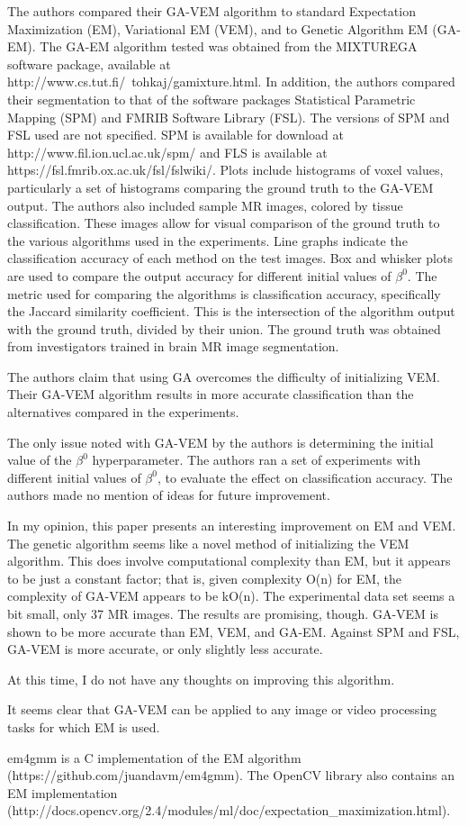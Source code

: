 \documentclass[11pt]{article}
\begin{document}
The authors compared their GA-VEM algorithm to standard Expectation Maximization
(EM), Variational EM (VEM), and to Genetic Algorithm EM (GA-EM). The GA-EM
algorithm tested was obtained from the MIXTUREGA software package, available at
\\ http://www.cs.tut.fi/~tohkaj/gamixture.html. In addition, the authors
compared their segmentation to that of the software packages Statistical
Parametric Mapping (SPM) and FMRIB Software Library (FSL). The versions of SPM
and FSL used are not specified. SPM is available for download at
http://www.fil.ion.ucl.ac.uk/spm/ and FLS is available at
https://fsl.fmrib.ox.ac.uk/fsl/fslwiki/. Plots include histograms of voxel
values, particularly a set of histograms comparing the ground truth to the
GA-VEM output. The authors also included sample MR images, colored by tissue
classification. These images allow for visual comparison of the ground truth to
the various algorithms used in the experiments. Line graphs indicate the
classification accuracy of each method on the test images. Box and whisker plots
are used to compare the output accuracy for different initial values of
\(\beta^0\). The metric used for comparing the algorithms is classification
accuracy, specifically the Jaccard similarity coefficient. This is the
intersection of the algorithm output with the ground truth, divided by their
union. The ground truth was obtained from investigators trained in brain MR
image segmentation.

The authors claim that using GA overcomes the difficulty of initializing VEM.
Their GA-VEM algorithm results in more accurate classification than the
alternatives compared in the experiments.

The only issue noted with GA-VEM by the authors is determining the initial value
of the \(\beta^0\) hyperparameter. The authors ran a set of experiments with
different initial values of \(\beta^0\), to evaluate the effect on
classification accuracy. The authors made no mention of ideas for future
improvement.

In my opinion, this paper presents an interesting improvement on EM and VEM. The
genetic algorithm seems like a novel method of initializing the VEM algorithm.
This does involve computational complexity than EM, but it appears to be just a
constant factor; that is, given complexity O(n) for EM, the complexity of GA-VEM
appears to be kO(n). The experimental data set seems a bit small, only 37 MR
images. The results are promising, though. GA-VEM is shown to be more accurate
than EM, VEM, and GA-EM. Against SPM and FSL, GA-VEM is more accurate, or only
slightly less accurate.

At this time, I do not have any thoughts on improving this algorithm.

It seems clear that GA-VEM can be applied to any image or video processing tasks
for which EM is used.

em4gmm is a C implementation of the EM algorithm \\
(https://github.com/juandavm/em4gmm). The OpenCV library also contains an EM
implementation \\
(http://docs.opencv.org/2.4/modules/ml/doc/expectation\_maximization.html).



\end{document}
